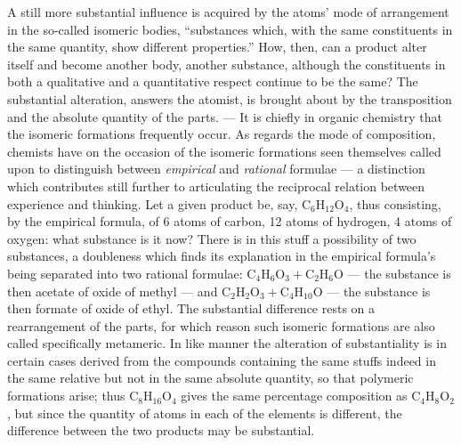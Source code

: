 \documentclass[12pt,a4paper]{book}
\begin{document}
A still more substantial influence is acquired by the atoms' mode of
arrangement in the so-called isomeric bodies, ``substances which, with the same
constituents in the same quantity, show different properties.'' How, then, can
a product alter itself and become another body, another
substance, although the constituents in both a qualitative and a quantitative
respect continue to be the same? The
substantial alteration, answers the atomist, is brought about by the
transposition and the absolute quantity of the parts. --- It is chiefly in
organic chemistry that the isomeric formations frequently occur. As regards the
mode of composition, chemists have on the occasion of the isomeric formations
seen themselves called upon to distinguish between \emph{empirical} and
\emph{rational} formulae --- a distinction which contributes still further to
articulating the reciprocal relation between experience and thinking. Let a
given product be, say, $\mathrm{C}_6\mathrm{H}_{12}\mathrm{O}_4$, thus
consisting, by the empirical formula, of 6 atoms of carbon, 12 atoms of
hydrogen, 4 atoms of
\setcounter{footnote}{0}
oxygen: what substance is it now? There is in this stuff a possibility of two
substances, a doubleness which finds its explanation in the empirical formula's
being separated into two rational formulae:
$\mathrm{C}_4\mathrm{H}_6\mathrm{O}_3 + \mathrm{C}_2\mathrm{H}_6\mathrm{O}$
--- the substance is then acetate of oxide of methyl --- and
$\mathrm{C}_2\mathrm{H}_2\mathrm{O}_3 + \mathrm{C}_4\mathrm{H}_{10}\mathrm{O}$
--- the substance is then formate of oxide of ethyl. The substantial difference
rests on a rearrangement of the parts, for which reason such isomeric
formations are also called specifically metameric. In like manner the
alteration of substantiality is in certain cases derived from the compounds
containing the same stuffs indeed in the same relative but not in the same
absolute quantity, so that polymeric formations arise; thus
$\mathrm{C}_8\mathrm{H}_{16}\mathrm{O}_4$ gives the same percentage
composition as $\mathrm{C}_4\mathrm{H}_8\mathrm{O}_2$, but since the quantity
of atoms in each of the elements is different, the difference between the two
products may be substantial.
\end{document}
